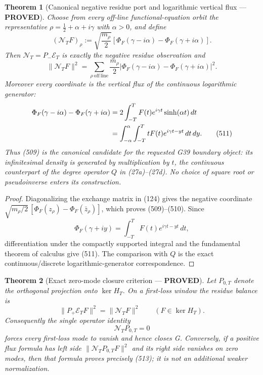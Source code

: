 \documentclass[11pt]{article}
\newtheorem{theorem}{Theorem}
\newcommand{\PROVED}{\textcolor{green!45!black}{\textbf{PROVED}}}
\begin{document}
\begin{theorem}[Canonical negative residue port and logarithmic vertical
flux --- \PROVED]
Choose from every off-line functional-equation orbit the representative
\(\rho=\frac12+\alpha+i\gamma\) with \(\alpha>0\), and define
\begin{equation}
 (\mathcal N_TF)_\rho
 :=\sqrt{\frac{m_\rho}{2}}\left[
   \Phi_F(\gamma-i\alpha)-\Phi_F(\gamma+i\alpha)\right].       \tag{509}
\end{equation}
Then \(\mathcal N_T=P_-\mathcal E_T\) is exactly the negative residue
observation and
\begin{equation}
 \|\mathcal N_TF\|^2
 =\sum_{\rho\ \mathrm{off\ line}}
   \frac{m_\rho}{2}
   |\Phi_F(\gamma-i\alpha)-\Phi_F(\gamma+i\alpha)|^2.          \tag{510}
\end{equation}
Moreover every coordinate is the vertical flux of the continuous
logarithmic generator:
\begin{align}
 \Phi_F(\gamma-i\alpha)-\Phi_F(\gamma+i\alpha)
 &=2\int_{-T}^{T}F(t)e^{i\gamma t}\sinh(\alpha t)\,dt\notag\\
 &=\int_{-\alpha}^{\alpha}\int_{-T}^{T}
      tF(t)e^{i\gamma t-yt}\,dt\,dy .                         \tag{511}
\end{align}
Thus (509) is the canonical candidate for the requested G39 boundary
object: its infinitesimal density is generated by multiplication by \(t\),
the continuous counterpart of the degree operator \(Q\) in (27a)--(27d).
No choice of square root or pseudoinverse enters its construction.
\end{theorem}

\begin{proof}
Diagonalizing the exchange matrix in (124) gives the negative coordinate
\(\sqrt{m_\rho/2}\,[\Phi_F(z_\rho)-\Phi_F(\bar z_\rho)]\), which proves
(509)--(510).  Since
\[
 \Phi_F(\gamma+iy)=\int_{-T}^{T}F(t)e^{i\gamma t-yt}\,dt,
\]
differentiation under the compactly supported integral and the fundamental
theorem of calculus give (511).  The comparison with \(Q\) is the exact
continuous/discrete logarithmic-generator correspondence.
\end{proof}

\begin{theorem}[Exact zero-mode closure criterion --- \PROVED]
Let \(P_{0,T}\) denote the orthogonal projection onto \(\ker H_T\).  On a
first-loss window the residue balance is
\begin{equation}
 \|P_+\mathcal E_TF\|^2=\|\mathcal N_TF\|^2
 \qquad(F\in\ker H_T).                                      \tag{512}
\end{equation}
Consequently the single operator identity
\begin{equation}
 \boxed{\mathcal N_TP_{0,T}=0}                              \tag{513}
\end{equation}
forces every first-loss mode to vanish and hence closes G.  Conversely,
if a positive flux formula has left side
\(\|\mathcal N_TP_{0,T}F\|^2\) and its right side vanishes on zero modes,
then that formula proves precisely (513); it is not an additional weaker
normalization.
\end{theorem}
\end{document}
